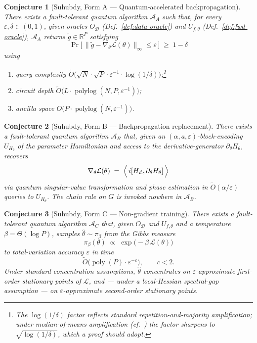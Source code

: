 \documentclass[11pt,a4paper]{article}
\newtheorem{conjecture}{Conjecture}
\theoremstyle{definition}
\DeclareMathOperator*{\poly}{poly}
\DeclareMathOperator*{\polylog}{polylog}
\newcommand{\Otil}{\widetilde{O}}
\newcommand{\R}{\mathbb{R}}
\newcommand{\veps}{\varepsilon}
\newcommand{\loss}{\mathcal{L}}
\newcommand{\Dset}{\mathcal{D}}
\newcommand{\Alg}{\mathcal{A}}
\begin{document}
\begin{conjecture}[Suhubdy, Form A --- Quantum-accelerated backpropagation]\label{conj:A}
There exists a fault-tolerant quantum algorithm $\Alg_A$ such that, for every $\veps, \delta \in (0,1)$, given oracles $O_\Dset$ (Def.~\ref{def:data-oracle}) and $U_{f,\theta}$ (Def.~\ref{def:fwd-oracle}), $\Alg_A$ returns $\tilde g \in \R^P$ satisfying
\[
\Pr\bigl[\,\|\tilde g - \nabla_\theta \loss(\theta)\|_\infty \le \veps\,\bigr] \;\ge\; 1 - \delta
\]
using
\begin{enumerate}[label=(\roman*),itemsep=0pt]
\item query complexity $\Otil\bigl(\sqrt{N}\cdot\sqrt{P}\cdot\veps^{-1}\cdot\log(1/\delta)\bigr)$;\footnote{The $\log(1/\delta)$ factor reflects standard repetition-and-majority amplification; under median-of-means amplification (cf.~\cite{CornelissenHamoudiJerbi2022}) the factor sharpens to $\sqrt{\log(1/\delta)}$, which a proof should adopt.}
\item circuit depth $\Otil\bigl(L\cdot\polylog(N,P,\veps^{-1})\bigr)$;
\item ancilla space $O\bigl(P\cdot\polylog(N,\veps^{-1})\bigr)$.
\end{enumerate}
\end{conjecture}

\begin{conjecture}[Suhubdy, Form B --- Backpropagation replacement]\label{conj:B}
There exists a fault-tolerant quantum algorithm $\Alg_B$ that, given an $(\alpha, a, \veps)$-block-encoding $U_{H_\theta}$ of the parameter Hamiltonian and access to the derivative-generator $\partial_\theta H_\theta$, recovers
\[
\nabla_\theta \loss(\theta) \;=\; \Bigl\langle\,i[H_\loss, \partial_\theta H_\theta]\,\Bigr\rangle
\]
via quantum singular-value transformation \cite{GSLW2019} and phase estimation in $\Otil(\alpha/\veps)$ queries to $U_{H_\theta}$. The chain rule on $G$ is invoked nowhere in $\Alg_B$.
\end{conjecture}

\begin{conjecture}[Suhubdy, Form C --- Non-gradient training]\label{conj:C}
There exists a fault-tolerant quantum algorithm $\Alg_C$ that, given $O_\Dset$ and $U_{f,\theta}$ and a temperature $\beta = \Theta(\log P)$, samples $\hat\theta \sim \pi_\beta$ from the Gibbs measure
\[
\pi_\beta(\theta) \;\propto\; \exp\bigl(-\beta\,\loss(\theta)\bigr)
\]
to total-variation accuracy $\veps$ in time
\[
\Otil\bigl(\poly(P)\cdot \veps^{-c}\bigr),\qquad c < 2.
\]
Under standard concentration assumptions, $\hat\theta$ concentrates on $\veps$-approximate first-order stationary points of $\loss$, and --- under a local-Hessian spectral-gap assumption --- on $\veps$-approximate second-order stationary points.
\end{conjecture}
\end{document}
